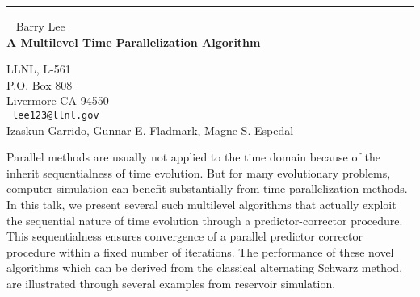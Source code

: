 \documentclass{report}
\begin{document}
\begin{center}

\rule{6in}{1pt} \
{\large
Barry Lee
\\ {\bf
A Multilevel Time Parallelization Algorithm
}}

LLNL, L-561 \\ P.O. Box 808 \\ Livermore CA 94550
\\ {\tt
lee123@llnl.gov
}
\\
Izaskun Garrido,
Gunnar E. Fladmark,
Magne S. Espedal
\end{center}

Parallel methods are usually not applied to the time domain because of
the inherit sequentialness of time evolution. But for many evolutionary
problems, computer simulation can benefit substantially from time
parallelization methods. In this talk, we present several such
multilevel algorithms that actually exploit the sequential nature of
time evolution through a predictor-corrector procedure. This
sequentialness ensures convergence of a parallel predictor corrector
procedure within a fixed number of iterations. The performance of these
novel algorithms which can be derived from the classical alternating
Schwarz method, are illustrated through several examples from reservoir
simulation.
\end{document}
